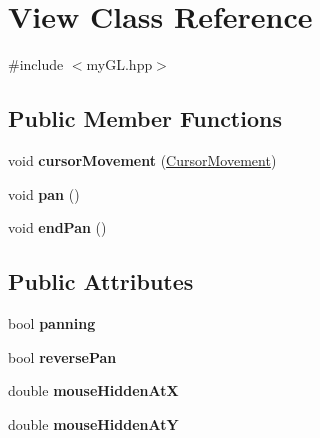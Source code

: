 \hypertarget{classView}{}\section{View Class Reference}
\label{classView}


{\ttfamily \#include $<$my\+G\+L.\+hpp$>$}

\subsection*{Public Member Functions}
\begin{DoxyCompactItemize}
\item 
void {\bfseries cursor\+Movement} (\hyperlink{classCursorMovement}{Cursor\+Movement})\hypertarget{classView_aaef0a135309a5f4d347b6f5457ed5167}{}\label{classView_aaef0a135309a5f4d347b6f5457ed5167}

\item 
void {\bfseries pan} ()\hypertarget{classView_a7032cb10b429abdd9bf2dcd2bea16e40}{}\label{classView_a7032cb10b429abdd9bf2dcd2bea16e40}

\item 
void {\bfseries end\+Pan} ()\hypertarget{classView_ac714b40d77c196fe0fd7c86e89a477fa}{}\label{classView_ac714b40d77c196fe0fd7c86e89a477fa}

\end{DoxyCompactItemize}
\subsection*{Public Attributes}
\begin{DoxyCompactItemize}
\item 
bool {\bfseries panning}\hypertarget{classView_a6adec4e5bdcc1204d9c19545b5c8ddbf}{}\label{classView_a6adec4e5bdcc1204d9c19545b5c8ddbf}

\item 
bool {\bfseries reverse\+Pan}\hypertarget{classView_adc268b708e33738a66655bdff10fea32}{}\label{classView_adc268b708e33738a66655bdff10fea32}

\item 
double {\bfseries mouse\+Hidden\+AtX}\hypertarget{classView_a1367d310d57894ab1b3d165b26d970ee}{}\label{classView_a1367d310d57894ab1b3d165b26d970ee}

\item 
double {\bfseries mouse\+Hidden\+AtY}\hypertarget{classView_a873de2cb56dd5ff51b447a485a61c788}{}\label{classView_a873de2cb56dd5ff51b447a485a61c788}

\end{DoxyCompactItemize}


